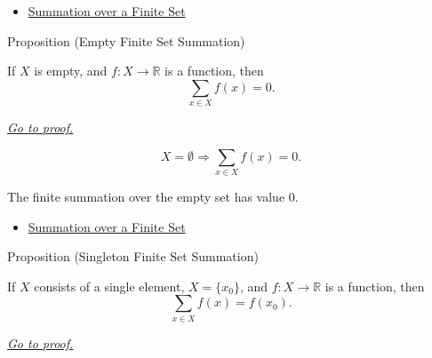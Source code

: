 \begin{dependencies}
\begin{itemize}
  \item \hyperref[def:summation-over-finite-set]{Summation over a Finite Set}
\end{itemize}
\end{dependencies}

\begin{propositionbox}{Proposition (Empty Finite Set Summation)}
\begin{proposition}
\label{prop:empty-finite-set-summation}

If \(X\) is empty, and \(f:X\to\mathbb{R}\) is a function, then
\[
  \sum_{x\in X} f(x)=0.
\]

\smallskip
\noindent
\hyperref[prf:empty-finite-set-summation]{\textit{Go to proof.}}
\end{proposition}
\end{propositionbox}

\begin{remark*}
\[
  X=\emptyset\Longrightarrow \sum_{x\in X}f(x)=0.
\]
\end{remark*}

\begin{remark*}[Interpretation]
The finite summation over the empty set has value \(0\).
\end{remark*}

\begin{dependencies}
\begin{itemize}
  \item \hyperref[def:summation-over-finite-set]{Summation over a Finite Set}
\end{itemize}
\end{dependencies}

\begin{propositionbox}{Proposition (Singleton Finite Set Summation)}
\begin{proposition}
\label{prop:singleton-finite-set-summation}

If \(X\) consists of a single element, \(X=\{x_0\}\), and
\(f:X\to\mathbb{R}\) is a function, then
\[
  \sum_{x\in X} f(x)=f(x_0).
\]

\smallskip
\noindent
\hyperref[prf:singleton-finite-set-summation]{\textit{Go to proof.}}
\end{proposition}
\end{propositionbox}

